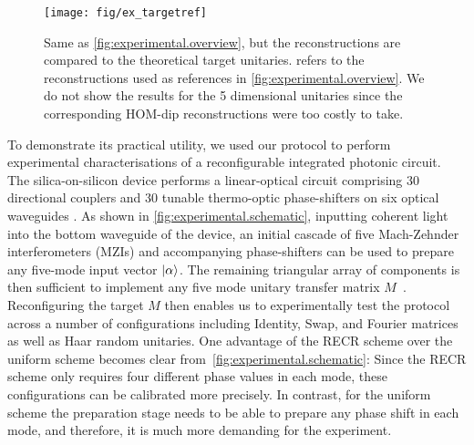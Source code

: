 \begin{figure}[tbp]
  \centering
  \texttt{[image: fig/ex\_targetref]}
  \caption{%
     \label{fig:experimental.targetref}
     Same as \cref{fig:experimental.overview}, but the reconstructions are compared to the theoretical target unitaries.
      refers to the reconstructions used as references in \cref{fig:experimental.overview}.
     We do not show the results for the 5 dimensional unitaries since the corresponding HOM-dip reconstructions were too costly to take.
  }
\end{figure}

To demonstrate its practical utility, we used our protocol to perform experimental characterisations of a reconfigurable integrated photonic circuit.
The silica-on-silicon device performs a linear-optical circuit comprising 30 directional couplers and 30 tunable thermo-optic phase-shifters on six optical waveguides \cite{Carolan2015}.
As shown in \cref{fig:experimental.schematic}, inputting coherent light into the bottom waveguide of the device, an initial cascade of five Mach-Zehnder interferometers (MZIs) and accompanying phase-shifters can be used to prepare any five-mode input vector $\ket{{\alpha}}$.
The remaining triangular array of components is then sufficient to implement any five mode unitary transfer matrix $M$~\cite{Reck1994}.
Reconfiguring the target $M$ then enables us to experimentally test the protocol across a number of configurations including Identity, Swap, and Fourier matrices as well as Haar random unitaries.
One advantage of the RECR scheme over the uniform scheme becomes clear from~\cref{fig:experimental.schematic}:
Since the RECR scheme only requires four different phase values in each mode, these configurations can be calibrated more precisely.
In contrast, for the uniform scheme the preparation stage needs to be able to prepare any phase shift in each mode, and therefore, it is much more demanding for the experiment.

